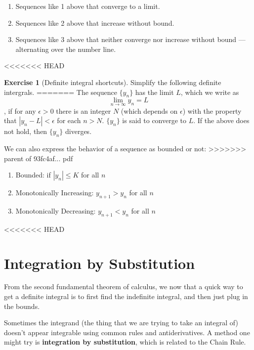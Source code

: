 \documentclass[]{book}
\providecommand{\tightlist}{%
  \setlength{\itemsep}{0pt}\setlength{\parskip}{0pt}}
\theoremstyle{definition}
\theoremstyle{definition}
\theoremstyle{definition}
\newtheorem{exercise}{Exercise}[chapter]
\theoremstyle{remark}
\begin{document}
\begin{enumerate}
\def\labelenumi{\arabic{enumi}.}
\tightlist
\item
  Sequences like 1 above that converge to a limit.
\item
  Sequences like 2 above that increase without bound.
\item
  Sequences like 3 above that neither converge nor increase without bound --- alternating over the number line.
\end{enumerate}

<<<<<<< HEAD
\begin{exercise}[Definite integral shortcuts]
\protect\hypertarget{exr:unnamed-chunk-30}{}{\label{exr:unnamed-chunk-30} {} }Simplify the following definite intergrals.
=======
\protect\hypertarget{def:unnamed-chunk-2}{}{\label{def:unnamed-chunk-2} }The sequence \(\{y_n\}\) has the limit \(L\), which we write as \[\lim\limits_{n \to \infty} y_n =L\], if for any \(\epsilon>0\) there is an integer \(N\) (which depends on \(\epsilon\)) with the property that \(|y_n -L|<\epsilon\) for each \(n>N\). \(\{y_n\}\) is said to converge to \(L\). If the above does not hold, then \(\{y_n\}\) diverges.

We can also express the behavior of a sequence as bounded or not:
>>>>>>> parent of 93fc4af... pdf

\begin{enumerate}
\def\labelenumi{\arabic{enumi}.}
\tightlist
\item
  Bounded: if \(|y_n|\le K\) for all \(n\)
\item
  Monotonically Increasing: \(y_{n+1}>y_n\) for all \(n\)
\item
  Monotonically Decreasing: \(y_{n+1}<y_n\) for all \(n\)
\end{enumerate}
<<<<<<< HEAD
\end{exercise}

\hypertarget{integration-by-substitution}{%
\section{Integration by Substitution}\label{integration-by-substitution}}

From the second fundamental theorem of calculus, we now that a quick way to get a definite integral is to first find the indefinite integral, and then just plug in the bounds.

Sometimes the integrand (the thing that we are trying to take an integral of) doesn't appear integrable using common rules and antiderivatives. A method one might try is \textbf{integration by substitution}, which is related to the Chain Rule.
\end{document}
